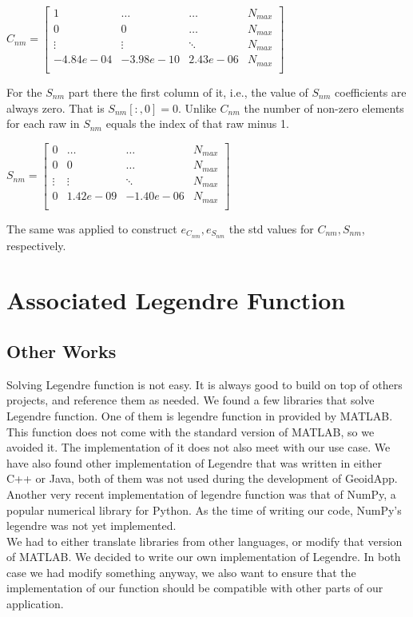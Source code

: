 	\(
	C_{nm} = \begin{bmatrix}
		1 & \ldots & \ldots& N_{max}\\
		0 & 0 & \dots & N_{max}\\
		\vdots &\vdots &\ddots & N_{max}\\
		-4.84e-04 & -3.98e-10 & 2.43e-06 & N_{max}\\

	\end{bmatrix}
	\)
	
	For the $S_{nm}$ part there the first column of it, i.e., the value of $S_{nm}$ coefficients are always zero. That is $S_{nm}[:, 0] = 0$. Unlike $C_{nm}$ the number of non-zero elements for each raw in $S_{nm}$ equals the index of that raw minus 1.
	
	\(
		S_{nm} = \begin{bmatrix}
		0 & \ldots &\ldots & N_{max}\\
		0 & 0 & \dots & N_{max}\\
		\vdots &\vdots &\ddots & N_{max}\\
		0 &  1.42e-09& -1.40e-06 & N_{max}\\
		
		\end{bmatrix}
	\)
	

	The same was applied to construct $e_{C_{nm}}, e_{S_{nm}}$ the std values for $C_{nm}, S_{nm}$, respectively.


\section{Associated Legendre Function}

\subsection{Other Works}
Solving Legendre function is not easy. It is always good to build on top of others projects, and reference them as needed. We found a few libraries that solve Legendre function. One of them is legendre function in provided by MATLAB. This function does not come with the standard version of MATLAB, so we avoided it. The implementation of it does not also meet with our use case. We have also found other implementation of Legendre that was written in either C++ or Java, both of them was not used during the development of GeoidApp. Another very recent implementation of legendre function was that of NumPy, a popular numerical library for Python. As the time of writing our code, NumPy's legendre was not yet implemented.
\\
We had to either translate libraries from other languages, or modify that version of MATLAB. We decided to write our own implementation of Legendre. In both case we had modify something anyway, we also want to ensure that the implementation of our function should be compatible with other parts of our application.

	
	
	
 

